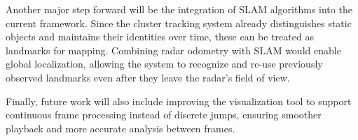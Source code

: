 Another major step forward will be the integration of SLAM algorithms into the current framework.  
Since the cluster tracking system already distinguishes static objects and maintains their identities over time, these can be treated as landmarks for mapping.  
Combining radar odometry with SLAM would enable global localization, allowing the system to recognize and re-use previously observed landmarks even after they leave the radar’s field of view.  

Finally, future work will also include improving the visualization tool to support continuous frame processing instead of discrete jumps, ensuring smoother playback and more accurate analysis between frames.
